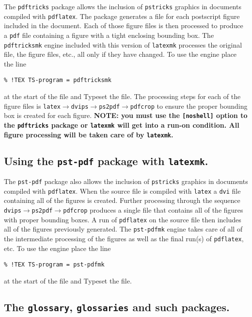 \documentclass[11pt]{article}
\begin{document}
The \texttt{pdftricks} package allows the inclusion of \texttt{pstricks} graphics in documents compiled with \texttt{pdflatex}. The package generates a file for each postscript figure included in the document. Each of those figure files is then processed to produce a \texttt{pdf} file containing a figure with a tight enclosing bounding box. The \texttt{pdftricksmk} engine included with this version of \texttt{latexmk} processes the original file, the figure files, etc., all only if they have changed. To use the engine place the line
\begin{verbatim}
% !TEX TS-program = pdftricksmk
\end{verbatim}
at the start of the file and Typeset the file. The processing steps for each of the figure files is \texttt{latex}\(\to\)\texttt{dvips}\(\to\)\texttt{ps2pdf}\(\to\)\texttt{pdfcrop} to ensure the proper bounding box is created for each figure. \textbf{NOTE: you must use the \texttt{[noshell]} option to the \texttt{pdftricks} package or \texttt{latexmk} will get into a run-on condition. All figure processing will be taken care of by \texttt{latexmk}.}

\subsection{Using the \texttt{pst-pdf} package with \texttt{latexmk}.}

The \texttt{pst-pdf} package also allows the inclusion of \texttt{pstricks} graphics in documents compiled with \texttt{pdflatex}. When the source file is compiled with \texttt{latex} a \texttt{dvi} file containing all of the figures is created. Further processing through the sequence \texttt{dvips}\(\to\)\texttt{ps2pdf}\(\to\)\texttt{pdfcrop} produces a single file that contains all of the figures with proper bounding boxes. A run of \texttt{pdflatex} on the source file then includes all of the figures previously generated. The \texttt{pst-pdfmk} engine takes care of all of the intermediate processing of the figures as well as the final run(s) of \texttt{pdflatex}, etc. To use the engine place the line
\begin{verbatim}
% !TEX TS-program = pst-pdfmk
\end{verbatim}
at the start of the file and Typeset the file.

\subsection{The \texttt{glossary}, \texttt{glossaries} and such packages.}
\end{document}
